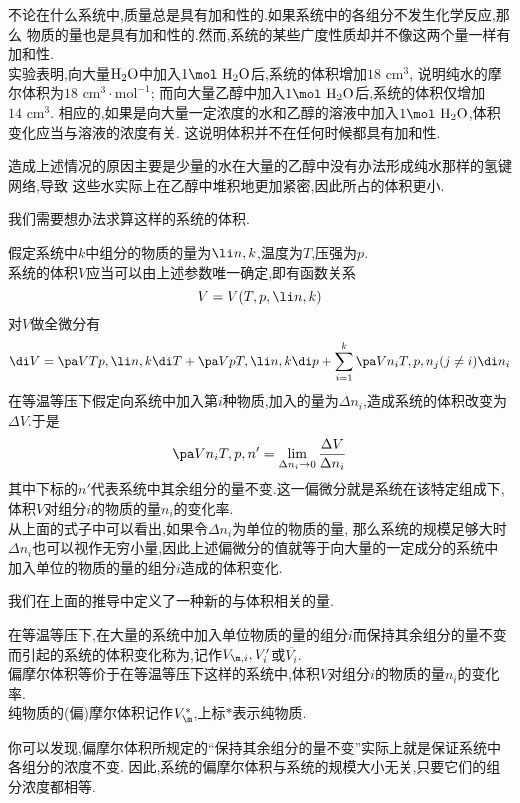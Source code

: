 \documentclass{ctexart}
\begin{document}
\indent 不论在什么系统中,质量总是具有加和性的.如果系统中的各组分不发生化学反应,那么%
物质的量也是具有加和性的.然而,系统的某些广度性质却并不像这两个量一样有加和性.\\
\indent 实验表明,向大量$\text H_2\text O$中加入$1\mol\ \text H_2\text O$后,系统的体积增加$18\text{ cm}^3$,%
说明纯水的摩尔体积为$18\text{ cm}^3\cdot\text{mol}^{-1}$;%
而向大量乙醇中加入$1\mol\ \text H_2\text O$后,系统的体积仅增加$14\text{ cm}^3$.%
相应的,如果是向大量一定浓度的水和乙醇的溶液中加入$1\mol\ \text H_2\text O$,体积变化应当与溶液的浓度有关.%
这说明体积并不在任何时候都具有加和性.
\begin{hint}
    造成上述情况的原因主要是少量的水在大量的乙醇中没有办法形成纯水那样的氢键网络,导致%
    这些水实际上在乙醇中堆积地更加紧密,因此所占的体积更小.
\end{hint}
我们需要想办法求算这样的系统的体积.
\begin{derivation}
    假定系统中$k$中组分的物质的量为$\li n,k$,温度为$T$,压强为$p$.\\
    系统的体积$V$应当可以由上述参数唯一确定,即有函数关系
    \[V=V(T,p,\li n,k)\]
    对$V$做全微分有
    \[\di V=\pa VT{p,\li n,k}\di T+\pa Vp{T,\li n,k}\di p+\sum_{i=1}^{k}\pa V{n_i}{T,p,n_{j}(j\neq i)}\di n_i\]
    在等温等压下假定向系统中加入第$i$种物质,加入的量为$\Delta n_i$,造成系统的体积改变为$\Delta V$.于是
    \[\pa V{n_i}{T,p,n'}=\lim_{\Delta n_i\to0}\dfrac{\Delta V}{\Delta n_i}\]
    其中下标的$n'$代表系统中其余组分的量不变.这一偏微分就是系统在该特定组成下,体积$V$对组分$i$的物质的量$n_i$的变化率.\\
    从上面的式子中可以看出,如果令$\Delta n_i$为单位的物质的量,%
    那么系统的规模足够大时$\Delta n_i$也可以视作无穷小量,因此上述偏微分的值就等于向大量的一定成分的系统中加入单位的物质的量的组分$i$造成的体积变化.%
\end{derivation}
我们在上面的推导中定义了一种新的与体积相关的量.
\begin{definition}[4B.2.1 偏摩尔体积]
    在等温等压下,在大量的系统中加入单位物质的量的组分$i$而保持其余组分的量不变而引起的系统的体积变化称为,记作$V_{\m,i},V_{i}'$或$\overline{V_i}$.\\
    偏摩尔体积等价于在等温等压下这样的系统中,体积$V$对组分$i$的物质的量$n_i$的变化率.\\
    纯物质的(偏)摩尔体积记作$V_{\m}^\ast$,上标$\ast$表示纯物质.
\end{definition}
你可以发现,偏摩尔体积所规定的“保持其余组分的量不变”实际上就是保证系统中各组分的浓度不变.%
因此,系统的偏摩尔体积与系统的规模大小无关,只要它们的组分浓度都相等.\\
\end{document}
